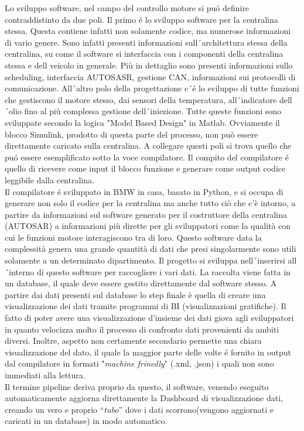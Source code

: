 \documentclass[../main.tex]{subfiles}
\begin{document}
Lo sviluppo software, nel campo del controllo motore si puó definire contraddistinto da due poli. Il primo é lo sviluppo software per la centralina stessa. Questa contiene infatti non solamente codice, ma numerose informazioni di vario genere. Sono infatti presenti informazioni sull´architettura stessa della centralina, su come il software si interfaccia con i componenti della centralina stessa e dell veicolo in generale. Più in dettaglio sono presenti informazioni sullo scheduling, interfaccia AUTOSASR,  gestione CAN, informazioni sui protocolli di comunicazione. All´altro polo della progettazione c´é lo sviluppo di tutte funzioni che  gestiscono il motore stesso, dai sensori della temperatura, all´indicatore dell´olio fino al più complessa gestione dell´iniezione. Tutte queste funzioni sono sviluppate secondo la logica "Model Based Design" in Matlab. Ovviamente il blocco Simulink, prodotto di questa parte del processo, non può essere direttamente caricato sulla centralina. A collegare questi poli si trova quello che puó essere esemplificato sotto la voce compilatore. Il compito del compilatore é quello di ricevere come input il blocco funzione e generare come output codice leggibile dalla centralina.\\ Il compilatore é sviluppato in BMW in casa, basato in Python, e si occupa di generare non solo il codice per la centralina ma anche tutto ciò che c'è intorno, a partire da informazioni sul software generato per il costruttore della centralina (AUTOSAR) a informazioni più dirette per gli sviluppatori come la qualità con cui le funzioni motore interagiscono tra di loro. Questo software data la complessità genera una grande quantità di dati che presi singolarmente sono utili solamente a un determinato dipartimento. Il progetto si sviluppa nell´inserirsi all´interno di questo software per raccogliere i vari dati. La raccolta viene fatta in un database, il quale deve essere gestito direttamente dal software stesso. A partire dai dati presenti sul database lo step finale è quella di creare una visualizzazione dei dati tramite programmi di BI (visualizzazioni gratifiche). Il fatto di poter avere una visualizzazione d'insieme dei dati giova agli sviluppatori in quanto velocizza molto il processo di confronto dati provenienti da ambiti diversi. Inoltre, aspetto non certamente secondario permette una chiara visualizzazione del dato, il quale la maggior parte delle volte é fornito in output dal compilatore in formati "\textit{machine frinedly}" (.xml, .json) i quali non sono immediati alla lettura.\\Il termine pipeline deriva proprio da questo, il software, venendo eseguito automaticamente aggiorna direttamente la Dashboard di visualizzazione dati, creando un vero e proprio “\textit{tubo}” dove i dati scorrono(vengono aggiornati e caricati in un database) in modo automatico. 

\cleardoublepage
\end{document}
